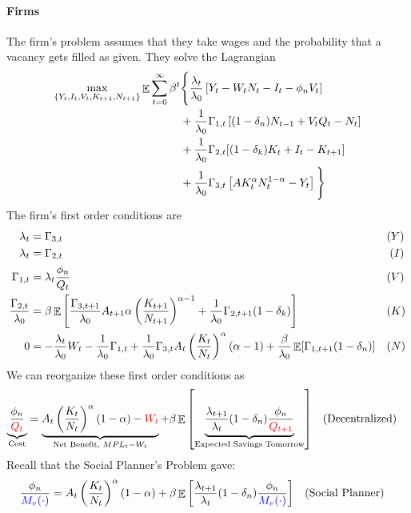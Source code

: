 \documentclass[10pt]{article}
\begin{document}
\begin{model}
	\paragraph{Firms} The firm's problem assumes that they take wages and the probability that a vacancy gets filled as given. They solve the Lagrangian
	\begin{align*}
		\max_{\{Y_t,I_t,V_t,K_{t+1},N_{t+1}\}} \mathop{\mathbb{E}} \sum_{t=0}^\infty \beta^t &\Bigg\{\frac{\lambda_t}{\lambda_0} \left[ Y_t - W_t N_t - I_t - \phi_n V_t\right] \\
		&+ \frac{1}{\lambda_0} \Gamma_{1,t}\left[ (1-\delta_n)N_{t-1} + V_tQ_t - N_t\right]  \\
		&+ \frac{1}{\lambda_0} \Gamma_{2,t}[(1-\delta_k)K_t + I_t - K_{t+1}] \\
		&+ \frac{1}{\lambda_0} \Gamma_{3,t} \left[ AK_t^\alpha N_t^{1-\alpha} - Y_t \right] \Bigg\}
	\end{align*}
	The firm's first order conditions are
	\begin{align*}
		\lambda_t &= \Gamma_{3,t} &&(Y) \\
		\lambda_t &= \Gamma_{2,t} &&\;(I)\\
		\Gamma_{1,t} &= \lambda_t \frac{\phi_n}{Q_t} &&(V) \\
		\frac{\Gamma_{2,t}}{\lambda_0} &= \beta \mathop{\mathbb{E}} \left[ \frac{\Gamma_{3,t+1}}{\lambda_0} A_{t+1} \alpha \left( \frac{K_{t+1}}{N_{t+1}}\right)^{\alpha - 1} + \frac{1}{\lambda_0} \Gamma_{2,t+1} (1-\delta_k) \right] &&(K) \\
		0 &= -\frac{\lambda_t}{\lambda_0} W_t - \frac{1}{\lambda_0} \Gamma_{1,t} + \frac{1}{\lambda_0} \Gamma_{3,t} A_t \left( \frac{K_t}{N_t}\right)^\alpha (\alpha - 1) + \frac{\beta}{\lambda_0} \mathop{\mathbb{E}}[\Gamma_{1,t+1}(1-\delta_n)] &&(N)
	\end{align*}
	We can reorganize these first order conditions as
	\begin{align*}
		\underbrace{\frac{\phi_n}{\textcolor{red}{Q_t}}}_{\text{Cost}} &= \underbrace{A_t \left( \frac{K_t}{N_t}\right)^\alpha (1-\alpha) - \textcolor{red}{W_t}}_{\text{Net Benefit, } MPL_t - W_t} + \beta \mathop{\mathbb{E}}\left[ \underbrace{\frac{\lambda_{t+1}}{\lambda_t} (1-\delta_n) \frac{\phi_n}{\textcolor{red}{Q_{t+1}}}}_{\text{Expected Savings Tomorrow}} \right] &&\text{(Decentralized)}
	\end{align*}
	Recall that the Social Planner's Problem gave:
	\begin{align*}
		\frac{\phi_n}{\textcolor{blue}{M_v(\cdot)}} &= A_t \parl \frac{K_t}{N_t}\parr^\alpha (1-\alpha) + \beta \expect\barl \frac{\lambda_{t+1}}{\lambda_t} (1-\delta_n) \frac{\phi_n}{\textcolor{blue}{M_v(\cdot)}}\barr  &&\text{(Social Planner)}

\end{align*}
\end{model}
\end{document}
